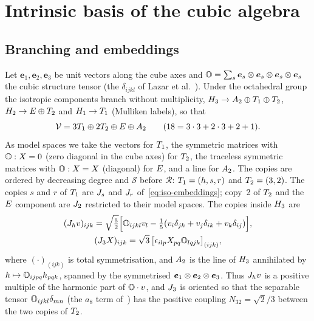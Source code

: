 \section{Intrinsic basis of the cubic algebra}\label{sec:cubic}

\subsection{Branching and embeddings}\label{sec:cubic-embeddings}

Let $\bm e_1,\bm e_2,\bm e_3$ be unit vectors along the cube axes and
$\mathbb{O}=\sum_{s}\bm e_s\otimes\bm e_s\otimes\bm e_s\otimes\bm e_s$ the cubic structure tensor (the
$\delta_{ijkl}$ of Lazar et al.~\cite[eq.~(37)]{Lazar2022}). Under the octahedral group
the isotropic components branch without multiplicity,
$H_{3}\to A_2\oplus T_1\oplus T_2$, $H_{2}\to E\oplus T_2$ and
$H_{1}\to T_1$ (Mulliken labels), so that
\begin{equation}
\mathcal{V}=3T_1\oplus2T_2\oplus E\oplus A_2\qquad(18=3\cdot3+2\cdot3+2+1).
\label{eq:cub-decomposition}
\end{equation}
As model spaces we take the vectors for $T_1$, the symmetric matrices with
$\mathbb{O}:X=0$ (zero diagonal in the cube axes) for $T_2$, the traceless symmetric
matrices with $\mathbb{O}:X=X$ (diagonal) for $E$, and a line for $A_2$. The copies
are ordered by decreasing degree and $\mathcal S$ before $\mathcal R$:
$T_1=(h,s,r)$ and $T_2=(3,2)$. The copies $s$ and $r$ of $T_1$ are
$J_{s}$ and $J_{r}$ of~\eqref{eq:iso-embeddings}; copy~2 of $T_2$ and the
$E$ component are $J_{2}$ restricted to their model spaces. The copies inside
$H_{3}$ are
\begin{equation}
\begin{gathered}
(J_{h}v)_{ijk}=\sqrt{\tfrac52}\Big[\mathbb{O}_{ijkl}v_l
-\tfrac15(v_i\delta_{jk}+v_j\delta_{ik}+v_k\delta_{ij})\Big],\\
(J_{3}X)_{ijk}=\sqrt3\,\big[\epsilon_{ilp}X_{pq}\mathbb{O}_{lqjk}\big]_{(ijk)},
\end{gathered}
\label{eq:cub-embeddings}
\end{equation}
where $(\cdot)_{(ijk)}$ is total symmetrisation, and $A_2$ is the line of $H_{3}$
annihilated by $h\mapsto \mathbb{O}_{ijpq}h_{pqk}$, spanned by the symmetrised
$\bm e_1\otimes\bm e_2\otimes\bm e_3$. Thus $J_{h}v$ is a positive multiple of the harmonic part of $\mathbb{O}\cdot v$, and $J_{3}$ is oriented so that the separable tensor
$\mathbb{O}_{ijkl}\delta_{mn}$ (the $a_8$ term of~\cite[eq.~(40)]{Lazar2022}) has the
positive coupling $N_{32}=\sqrt2/3$ between the two copies of $T_2$.


